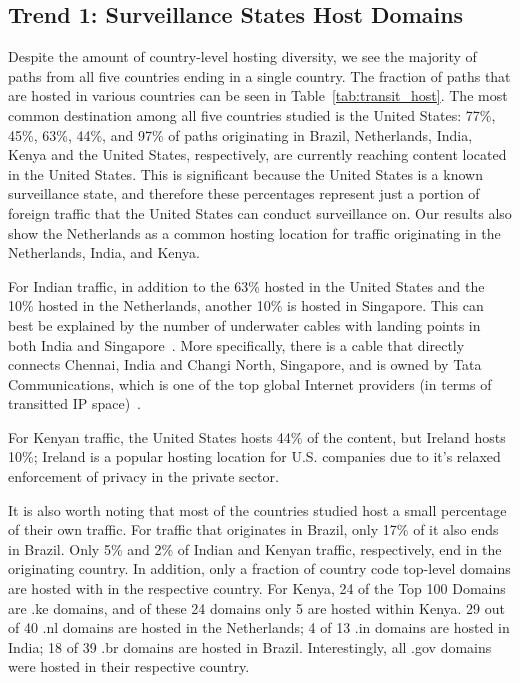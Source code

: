 \subsection{Trend 1: Surveillance States Host Domains}
\label{trend1}
Despite the amount of country-level hosting diversity, we see the majority of paths from all five countries ending in a single country.  The fraction of paths that are hosted in various countries can be seen in Table~\ref{tab:transit_host}.  The most common destination among all five countries studied is the United States: 77\%, 45\%, 63\%, 44\%, and 97\% of paths originating in Brazil, Netherlands, India, Kenya and the United States, respectively, are currently reaching content located in the United States.  This is significant because the United States is a known surveillance state, and therefore these percentages represent just a portion of foreign traffic that the United States can conduct surveillance on.  Our results also show the Netherlands as a common hosting location for traffic originating in the Netherlands, India, and Kenya.

For Indian traffic, in addition to the 63\% hosted in the United States and the 10\% hosted in the Netherlands, another 10\% is hosted in Singapore.  This can best be explained by the number of underwater cables with landing points in both India and Singapore~\cite{cablemap}.  More specifically, there is a cable that directly connects Chennai, India and Changi North, Singapore, and is owned by Tata Communications, which is one of the top global Internet providers (in terms of transitted IP space)~\cite{bakers}.  

For Kenyan traffic, the United States hosts 44\% of the content, but Ireland hosts 10\%; Ireland is a popular hosting location for U.S. companies due to it's relaxed enforcement of privacy in the private sector.  

It is also worth noting that most of the countries studied host a small percentage of their own traffic.  For traffic that originates in Brazil, only 17\% of it also ends in Brazil.  Only 5\% and 2\% of Indian and Kenyan traffic, respectively, end in the originating country.  In addition, only a fraction of country code top-level domains are hosted with in the respective country.  For Kenya, 24 of the Top 100 Domains are .ke domains, and of these 24 domains only 5 are hosted within Kenya.  29 out of 40 .nl domains are hosted in the Netherlands; 4 of 13 .in domains are hosted in India; 18 of 39 .br domains are hosted in Brazil.  Interestingly, all .gov domains were hosted in their respective country.

